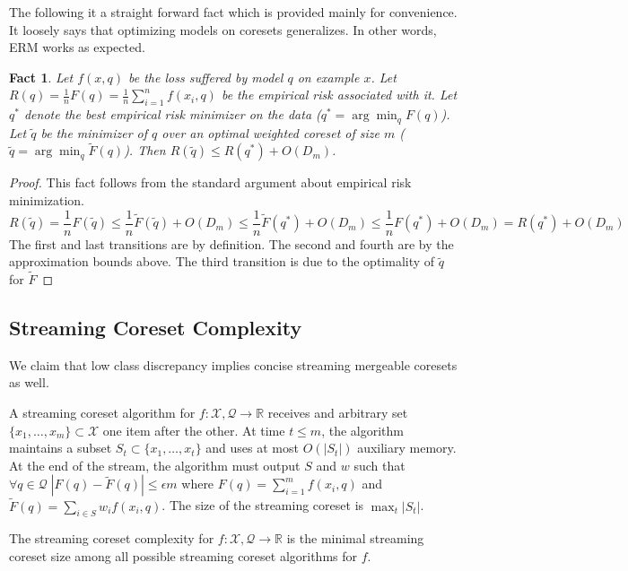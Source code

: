 \documentclass[12pt]{colt2019} %
\newtheorem{fact}[theorem]{Fact}
\newcommand{\R}{\mathbb{R}}
\newcommand{\eps}{\epsilon}
\newcommand{\X}{\mathcal{X}}
\newcommand{\Q}{\mathcal{Q}}
\begin{document}
The following it a straight forward fact which is provided mainly for convenience. 
It loosely says that optimizing models on coresets generalizes. In other words, ERM works as expected.
\begin{fact}
Let $f(x,q)$ be the loss suffered by model $q$ on example $x$. 
Let $R(q) = \frac{1}{n}F(q) = \frac{1}{n} \sum_{i=1}^n f(x_i,q)$ be the {\it empirical} risk associated with it.
Let $q^*$ denote the best empirical risk minimizer on the data ($q^* = \arg\min_q F(q)$).
Let $\tilde q$ be the minimizer of $q$ over an optimal weighted coreset of size $m$ ($\tilde q = \arg\min_q \tilde F(q)$).
Then $R(\tilde q) \le R(q^*) + O(D_m)$.
\end{fact}
\begin{proof}
This fact follows from the standard argument about empirical risk minimization.
\[
R(\tilde q) = \frac1n F(\tilde q)  \le  \frac{1}{n} \tilde F(\tilde q) + O(D_m) \le \frac{1}{n} \tilde F(q^*) + O(D_m) \le  \frac{1}{n}  F(q^*) + O(D_m)  = R(q^*)+ O(D_m)
\]
The first and last transitions are by definition. The second and fourth are by the approximation bounds above.
The third transition is due to the optimality of $\tilde q$ for $\tilde F$
\end{proof}


\subsection{Streaming Coreset Complexity}\label{sec:sketch}
We claim that low class discrepancy implies concise streaming mergeable coresets as well. 
%
\begin{definition}  
A streaming coreset algorithm for $f:\X,\Q \rightarrow \R$ receives and arbitrary set $\{x_1,\ldots,x_m\} \subset \X$ one item after the other.
At time $t \le m$, the algorithm maintains a subset $S_t \subset \{x_1,\ldots,x_t\}$ and uses at most $O(|S_t|)$ auxiliary memory. 
At the end of the stream, the algorithm must output $S$ and $w$ such that  $\forall q \in \Q \; |F(q)  - \tilde F(q)| \le \eps m$ where 
$F(q) = \sum_{i=1}^{m} f(x_i,q)$ and $\tilde F(q) = \sum_{i \in S}w_i f(x_i,q)$.
The size of the streaming coreset is $\max_t |S_t|$.
\end{definition}

\begin{definition}  
The streaming coreset complexity for $f:\X,\Q \rightarrow \R$ is the minimal streaming coreset size among all possible 
streaming coreset algorithms for $f$.
\end{definition}
\end{document}

